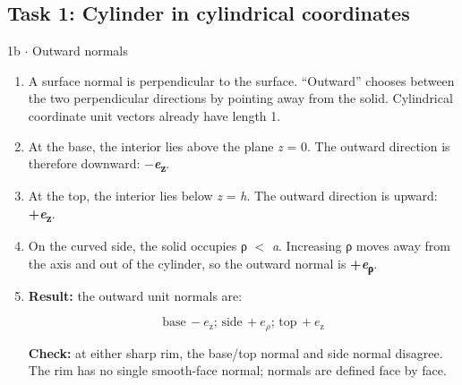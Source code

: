 \documentclass[11pt]{article}
\begin{document}
\begin{keepsection}\subsection{Task 1: Cylinder in cylindrical coordinates}

\begin{workedbox}{1b \ensuremath{\cdot} Outward normals}
\begin{enumerate}
\item A surface normal is perpendicular to the surface. “Outward” chooses between the two perpendicular directions by pointing away from the solid. Cylindrical coordinate unit vectors already have length 1.
\item At the base, the interior lies above the plane \textit{z} = 0. The outward direction is therefore downward: \textbf{\ensuremath{-}\textit{e}\textsubscript{z}}.
\item At the top, the interior lies below \textit{z} = \textit{h}. The outward direction is upward: \textbf{+\textit{e}\textsubscript{z}}.
\item On the curved side, the solid occupies ρ \ensuremath{<} \textit{a}. Increasing ρ moves away from the axis and out of the cylinder, so the outward normal is \textbf{+\textit{e}\textsubscript{ρ}}.
\item {}
\textbf{Result:} the outward unit normals are:

\begin{equation*}\text{base}\, -{e}_{\mathrm{z}};\, \text{side}\, +{e}_{ρ};\, \text{top}\, +{e}_{\mathrm{z}}\end{equation*}

\textbf{Check:} at either sharp rim, the base/top normal and side normal disagree. The rim has no single smooth-face normal; normals are defined face by face.
\end{enumerate}
\end{workedbox}

\end{keepsection}
\end{document}
